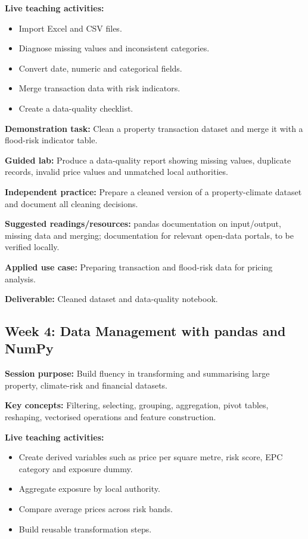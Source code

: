 \documentclass[
  a4paper,
]{article}
\providecommand{\tightlist}{%
  \setlength{\itemsep}{0pt}\setlength{\parskip}{0pt}}
\begin{document}
\textbf{Live teaching activities:}

\begin{itemize}
\tightlist
\item
  Import Excel and CSV files.
\item
  Diagnose missing values and inconsistent categories.
\item
  Convert date, numeric and categorical fields.
\item
  Merge transaction data with risk indicators.
\item
  Create a data-quality checklist.
\end{itemize}

\textbf{Demonstration task:} Clean a property transaction dataset and
merge it with a flood-risk indicator table.

\textbf{Guided lab:} Produce a data-quality report showing missing
values, duplicate records, invalid price values and unmatched local
authorities.

\textbf{Independent practice:} Prepare a cleaned version of a
property-climate dataset and document all cleaning decisions.

\textbf{Suggested readings/resources:} pandas documentation on
input/output, missing data and merging; documentation for relevant
open-data portals, to be verified locally.

\textbf{Applied use case:} Preparing transaction and flood-risk data for
pricing analysis.

\textbf{Deliverable:} Cleaned dataset and data-quality notebook.

\subsection{Week 4: Data Management with pandas and
NumPy}\label{week-4-data-management-with-pandas-and-numpy}

\textbf{Session purpose:} Build fluency in transforming and summarising
large property, climate-risk and financial datasets.

\textbf{Key concepts:} Filtering, selecting, grouping, aggregation,
pivot tables, reshaping, vectorised operations and feature construction.

\textbf{Live teaching activities:}

\begin{itemize}
\tightlist
\item
  Create derived variables such as price per square metre, risk score,
  EPC category and exposure dummy.
\item
  Aggregate exposure by local authority.
\item
  Compare average prices across risk bands.
\item
  Build reusable transformation steps.
\end{itemize}
\end{document}
